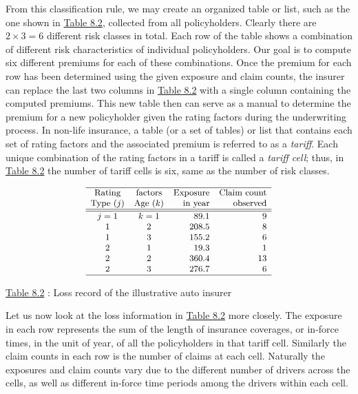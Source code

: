 \documentclass[]{book}
\theoremstyle{definition}
\theoremstyle{definition}
\theoremstyle{definition}
\theoremstyle{remark}
\begin{document}
From this classification rule, we may create an organized table or list,
such as the one shown in \protect\hyperlink{tab:8.2}{Table 8.2},
collected from all policyholders. Clearly there are \(2 \times 3=6\)
different risk classes in total. Each row of the table shows a
combination of different risk characteristics of individual
policyholders. Our goal is to compute six different premiums for each of
these combinations. Once the premium for each row has been determined
using the given exposure and claim counts, the insurer can replace the
last two columns in \protect\hyperlink{tab:8.2}{Table 8.2} with a single
column containing the computed premiums. This new table then can serve
as a manual to determine the premium for a new policyholder given the
rating factors during the underwriting process. In non-life insurance, a
table (or a set of tables) or list that contains each set of rating
factors and the associated premium is referred to as a \emph{tariff}.
Each unique combination of the rating factors in a tariff is called a
\emph{tariff cell}; thus, in \protect\hyperlink{tab:8.2}{Table 8.2} the
number of tariff cells is six, same as the number of risk classes.

\[
{\small
\begin{matrix}
\begin{array}{ccrrc}
 \hline
\text{Rating} &\text{factors}  &   \text{Exposure} & \text{Claim count} \\
\text{Type }(j) & \text{Age }(k) &  \text{in year} & \text{observed}\\
\hline \hline
j=1 & k=1 &  89.1 & 9\\
1 & 2   & 208.5& 8\\
1 & 3  & 155.2 & 6  \\
2  & 1  & 19.3 & 1 \\
2  & 2  & 360.4 & 13 \\
2   & 3  & 276.7 & 6 \\ \hline
\end{array}
\end{matrix}
}
\]

\protect\hyperlink{tab:8.2}{Table 8.2} : Loss record of the illustrative
auto insurer

Let us now look at the loss information in
\protect\hyperlink{tab:8.2}{Table 8.2} more closely. The exposure in
each row represents the sum of the length of insurance coverages, or
in-force times, in the unit of year, of all the policyholders in that
tariff cell. Similarly the claim counts in each row is the number of
claims at each cell. Naturally the exposures and claim counts vary due
to the different number of drivers across the cells, as well as
different in-force time periods among the drivers within each cell.
\end{document}
